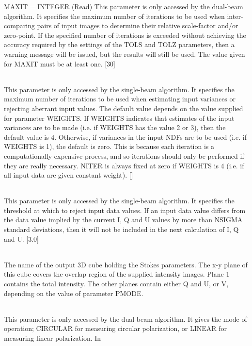 \documentclass[twoside,11pt]{article}
\renewcommand{\_}{\texttt{\symbol{95}}}
\newcommand{\sstsubsection}[1]{ \item[{#1}] \mbox{} \\}
\newcommand{\sstsubsection}[1]{\item[{#1}]}
\begin{document}
{{{         MAXIT = \_INTEGER (Read)
      }{
         This parameter is only accessed by the dual-beam algorithm. It
         specifies the maximum number of iterations to be used when
         inter-comparing pairs of input images to determine their relative
         scale-factor and/or zero-point. If the specified number of
         iterations is exceeded without achieving the accuracy required by
         the settings of the TOLS and TOLZ parameters, then a warning message
         will be issued, but the results will still be used. The value given
         for MAXIT must be at least one. [30]
      }
      \sstsubsection{
         NITER = \_INTEGER (Read)
      }{
         This parameter is only accessed by the single-beam algorithm. It
         specifies the maximum number of iterations to be used when
         estimating input variances or rejecting aberrant input values.
         The default value depends on the value supplied for parameter
         WEIGHTS. If WEIGHTS indicates that estimates of the input
         variances are to be made (i.e. if WEIGHTS has the value 2 or 3),
         then the default value is 4. Otherwise, if variances in the input
         NDFs are to be used (i.e. if WEIGHTS is 1), the default is zero.
         This is because each iteration is a computationally expensive
         process, and so iterations should only be performed if they are
         really necessary. NITER is always fixed at zero if WEIGHTS is 4
         (i.e. if all input data are given constant weight). []
      }
      \sstsubsection{
         NSIGMA = \_REAL (Read)
      }{
         This parameter is only accessed by the single-beam algorithm. It
         specifies the threshold at which to reject input data values. If
         an input data value differs from the data value implied by the
         current I, Q and U values by more than NSIGMA standard
         deviations, then it will not be included in the next calculation
         of I, Q and U. [3.0]
      }
      \sstsubsection{
         OUT = NDF (Read)
      }{
         The name of the output 3D cube holding the Stokes parameters.
         The x-y plane of this cube covers the overlap region of the
         supplied intensity images. Plane 1 contains the total intensity.
         The other planes contain either Q and U, or V, depending on the
         value of parameter PMODE.
      }
      \sstsubsection{
         PMODE = LITERAL (Read)
      }{
         This parameter is only accessed by the dual-beam algorithm. It
         gives the mode of operation; CIRCULAR for measuring circular
         polarization, or LINEAR for measuring linear polarization. In
}}}
\end{document}
